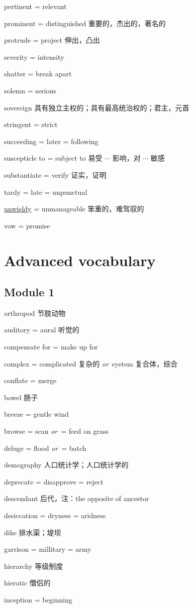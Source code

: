 \documentclass[UTF8, fontset = none, zihao = -4, linespread = 1.1]{ctexart}
\renewcommand{\o}{\textit{or}\ }
\begin{document}
\begin{multicols}{2}
pertinent = relevant

prominent = distinguished 重要的，杰出的，著名的

protrude = project 伸出，凸出

severity = intensity

shatter = break apart

solemn = serious

sovereign 具有独立主权的；具有最高统治权的；君主，元首

stringent = strict

succeeding = later = following

suscepticle to = subject to 易受 $\cdots$ 影响，对 $\cdots$ 敏感

substantiate = verify 证实，证明

tardy = late = unpunctual

\underline{unwieldy} = unmanageable 笨重的，难驾驭的

vow = promise

\section{Advanced vocabulary}
\subsection{Module 1}
arthropod 节肢动物

auditory = aural 听觉的

compensate for = make up for

complex = complicated 复杂的 \o system 复合体，综合

conflate = merge

bowel 肠子

breeze = gentle wind

browse = scan \o = feed on grass

deluge = flood \o = batch

demography 人口统计学；人口统计学的

deprecate = disapprove = reject

descendant 后代，注：the opposite of ancestor

desiccation = dryness = aridness

dike 排水渠；堤坝

garrison = millitary = army

hierarchy 等级制度

hieratic 僧侣的

inception = beginning


\end{multicols}
\end{document}
